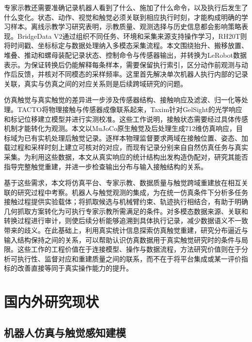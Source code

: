 专家示教还需要准确记录机器人看到了什么、施加了什么命令，以及执行后发生了什么变化。状态、动作、视觉和触觉必须关联到相应执行时刻，才能构成明确的学习样本。离线示教学习研究表明，示教质量、观测选择与历史信息都会影响策略表现\cite{mandlekar2022demonstrations}。BridgeData V2通过组织不同任务、环境和采集来源支持操作学习，RH20T则将时间戳、坐标标定与数据处理纳入多模态采集流程\cite{walke2023bridgedata,fang2024rh20t}。本文围绕抬升、搬移放置、堆叠、推动和螺母装配记录状态、控制命令与传感器输出，并转换为LeRobot数据表示。为保证转换后仍能解释每条样本，需要保留执行索引，区分动作前观测与动作后反馈，并核对不同模态的采样频率。这里首先解决单次机器人执行内部的记录关联，真实与仿真之间的对应关系则是后续跨域研究的问题。

仿真触觉与真实触觉的差异进一步涉及传感器结构、接触响应及滤波、归一化等处理。TACTO将物理接触与传感器成像联系起来，Taxim针对GelSight的光学响应和标记位移建立模型并进行实测校准\cite{wang2022tacto,si2022taxim}。这些工作说明，接触状态需要经过具体传感机制才能转化为观测。本文以MuJoCo原生触觉及后处理生成712维仿真响应，目标域为已有实机处理后触觉记录。逐样本物理监督要求两域在接触位置、姿态、加载过程和采样时刻上建立可核对的对应，而现有记录分别来自自然仿真任务与真实采集。为利用这些数据，本文从真实响应的统计结构出发构造伪配对，研究其能否指导完整触觉重建，并进一步检查输出分布与输入接触结构的关系。

基于这些需求，本文将仿真平台、专家示教、数据质量与触觉跨域重建放在相互关联的研究过程中考察。机器人与触觉观测的集成，为在统一仿真条件下分析多任务接触过程提供实验载体；将抓取候选与机械臂约束、轨迹执行相结合，有助于明确几何抓取方案转化为可执行专家示教所需满足的条件。对多模态数据来源、关联和转换过程进行审计，则使后续分析能够追溯到具体执行记录，减少数据语义不一致带来的歧义。在此基础上，利用真实统计信息探索仿真触觉重建，研究分布逼近与输入结构保持之间的关系，可以帮助认识仿真数据用于真实触觉研究时的条件与局限。这些工作的工程价值在于连接模型、操作与数据流程，方法研究价值则在于分析可执行性、监督对应和重建质量之间的联系，而不在于将平台集成或某一评价指标的改善直接等同于真实操作能力的提升。

\section{国内外研究现状}
\label{sec:related_work}

\subsection{机器人仿真与触觉感知建模}
\label{subsec:simulation_tactile_modeling}

